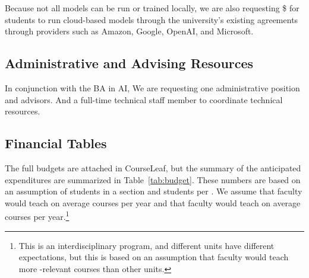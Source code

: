 Because not all models can be run or trained locally, we are also requesting \$\cloud{} for students to run cloud-based models through the university's existing agreements through providers such as Amazon, Google, OpenAI, and Microsoft.

\subsection{Administrative and Advising Resources}



In conjunction with the BA in AI, We are requesting one administrative position and \advisors{} advisors.  And a full-time technical staff member to coordinate technical resources.

\subsection{Financial Tables}

The full budgets are attached in CourseLeaf, but the summary of the anticipated expenditures are summarized in Table~\ref{tab:budget}.  These numbers are based on an assumption of \StudentsperSection{} students in a section and \StudentsperTA{} students per .  We assume that  faculty would teach on average \PTKLoad{} courses per year and that  faculty would teach on average \TTKLoad{} courses per year.\footnote{This is an interdisciplinary program, and different units have different expectations, but this is based on an assumption that  faculty would teach more -relevant courses than other units.}
